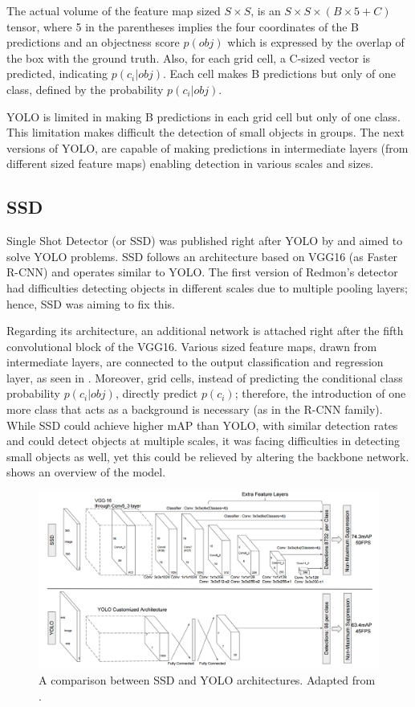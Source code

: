 The actual volume of the feature map sized $S\times S$, is an $S\times S \times (B\times5+C)$ tensor, where 5 in the parentheses implies the four coordinates of the B predictions and an objectness score $p(obj)$ which is expressed by the overlap of the box with the ground truth. Also, for each grid cell, a C-sized vector is predicted, indicating $p(c_i|obj)$. Each cell makes B predictions but only of one class, defined by the probability $p(c_i|obj)$. 

YOLO is limited in making B predictions in each grid cell but only of one class. This limitation makes difficult the detection of small objects in groups. The next versions of YOLO, are capable of making predictions in intermediate layers (from different sized feature maps) enabling detection in various scales and sizes. 
 
\subsection{SSD}
Single Shot Detector (or SSD) was published right after YOLO by \cite{liu2016ssd} and aimed to solve YOLO problems. SSD follows an architecture based on VGG16 (as Faster R-CNN) and operates similar to YOLO. The first version of Redmon's detector had difficulties detecting objects in different scales due to multiple pooling layers; hence, SSD was aiming to fix this. 

Regarding its architecture, an additional network is attached right after the fifth convolutional block of the VGG16. Various sized feature maps, drawn from intermediate layers, are connected to the output classification and regression layer, as seen in . Moreover, grid cells, instead of predicting the conditional class probability $p(c_i|obj)$, directly predict $p(c_i)$; therefore, the introduction of one more class that acts as a background is necessary (as in the R-CNN family). While SSD could achieve higher mAP than YOLO, with similar detection rates and could detect objects at multiple scales, it was facing difficulties in detecting small objects as well, yet this could be relieved by altering the backbone network.   shows an overview of the model.
 
\begin{figure}[!htb]
  \centering
  \includegraphics[width=12cm]{figures/ch2/fig6.png}
  \caption{A comparison between SSD and YOLO architectures. Adapted from \cite{liu2016ssd}.}
  \label{ch2:fig6}
\end{figure} 
 
